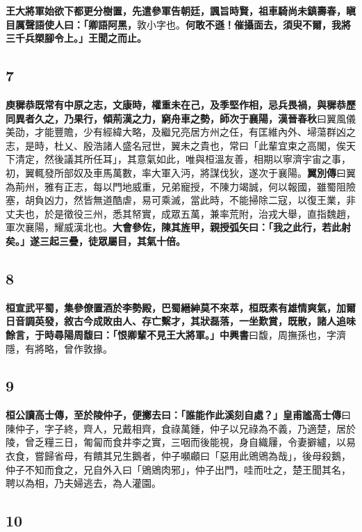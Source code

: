 \textbf{王大將軍始欲下都更分樹置，先遣參軍告朝廷，諷旨時賢，祖車騎尚未鎮壽春，瞋目厲聲語使人曰：「卿語阿黑，}{\footnotesize 敦小字也。}\textbf{何敢不遜！催攝面去，須臾不爾，我將三千兵槊腳令上。」王聞之而止。}

\subsection*{7}

\textbf{庾穉恭既常有中原之志，文康時，權重未在己，及季堅作相，忌兵畏禍，與穉恭歷同異者久之，乃果行，傾荊漢之力，窮舟車之勢，師次于襄陽，}{\footnotesize \textbf{漢晉春秋}曰翼風儀美劭，才能豐贍，少有經緯大略，及繼兄亮居方州之任，有匡維內外、埽蕩群凶之志，是時，杜乂、殷浩諸人盛名冠世，翼未之貴也，常曰「此輩宜束之高閣，俟天下清定，然後議其所任耳」，其意氣如此，唯與桓溫友善，相期以寧濟宇宙之事，初，翼輒發所部奴及車馬萬數，率大軍入沔，將謀伐狄，遂次于襄陽。\textbf{翼別傳}曰翼為荊州，雅有正志，每以門地威重，兄弟寵授，不陳力竭誠，何以報國，雖蜀阻險塞，胡負凶力，然皆無道酷虐，易可乘滅，當此時，不能掃除二寇，以復王業，非丈夫也，於是徵役三州，悉其帑實，成眾五萬，兼率荒附，治戎大舉，直指魏趙，軍次襄陽，耀威漢北也。}\textbf{大會參佐，陳其旌甲，親授弧矢曰：「我之此行，若此射矣。」遂三起三疊，徒眾屬目，其氣十倍。}

\subsection*{8}

\textbf{桓宣武平蜀，集參僚置酒於李勢殿，巴蜀縉紳莫不來萃，桓既素有雄情爽氣，加爾日音調英發，敘古今成敗由人、存亡繫才，其狀磊落，一坐歎賞，既散，諸人追味餘言，于時尋陽周馥曰：「恨卿輩不見王大將軍。」}{\footnotesize \textbf{中興書}曰馥，周撫孫也，字濟隱，有將略，曾作敦掾。}

\subsection*{9}

\textbf{桓公讀高士傳，至於陵仲子，便擲去曰：「誰能作此溪刻自處？」}{\footnotesize \textbf{皇甫謐高士傳}曰陳仲子，字子終，齊人，兄戴相齊，食祿萬鍾，仲子以兄祿為不義，乃適楚，居於陵，曾乏糧三日，匍匐而食井李之實，三咽而後能視，身自織屨，令妻擗纑，以易衣食，嘗歸省母，有饋其兄生鵝者，仲子嚬顣曰「惡用此鶂鶂為哉」，後母殺鵝，仲子不知而食之，兄自外入曰「鶂鶂肉邪」，仲子出門，哇而吐之，楚王聞其名，聘以為相，乃夫婦逃去，為人灌園。}

\subsection*{10}

